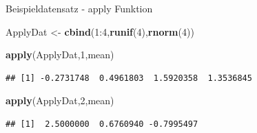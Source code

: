 \documentclass[
  ignorenonframetext,
]{beamer}
\newenvironment{Shaded}{\begin{snugshade}}{\end{snugshade}}
\newcommand{\DecValTok}[1]{\textcolor[rgb]{0.27,0.67,0.26}{#1}}
\newcommand{\KeywordTok}[1]{\textcolor[rgb]{0.26,0.66,0.93}{\textbf{#1}}}
\newcommand{\NormalTok}[1]{\textcolor[rgb]{0.74,0.68,0.62}{#1}}
\newcommand{\OperatorTok}[1]{\textcolor[rgb]{0.74,0.68,0.62}{#1}}
\newcommand{\StringTok}[1]{\textcolor[rgb]{0.02,0.61,0.04}{#1}}
\begin{document}
\begin{frame}[fragile]{Beispieldatensatz - apply Funktion}
\protect\hypertarget{beispieldatensatz---apply-funktion}{}

\begin{Shaded}
\begin{Highlighting}[]
\NormalTok{ApplyDat <-}\StringTok{ }\KeywordTok{cbind}\NormalTok{(}\DecValTok{1}\OperatorTok{:}\DecValTok{4}\NormalTok{,}\KeywordTok{runif}\NormalTok{(}\DecValTok{4}\NormalTok{),}\KeywordTok{rnorm}\NormalTok{(}\DecValTok{4}\NormalTok{))}
\end{Highlighting}
\end{Shaded}

\begin{Shaded}
\begin{Highlighting}[]
\KeywordTok{apply}\NormalTok{(ApplyDat,}\DecValTok{1}\NormalTok{,mean)}
\end{Highlighting}
\end{Shaded}

\begin{verbatim}
## [1] -0.2731748  0.4961803  1.5920358  1.3536845
\end{verbatim}

\begin{Shaded}
\begin{Highlighting}[]
\KeywordTok{apply}\NormalTok{(ApplyDat,}\DecValTok{2}\NormalTok{,mean)}
\end{Highlighting}
\end{Shaded}

\begin{verbatim}
## [1]  2.5000000  0.6760940 -0.7995497
\end{verbatim}

\end{frame}
\end{document}
